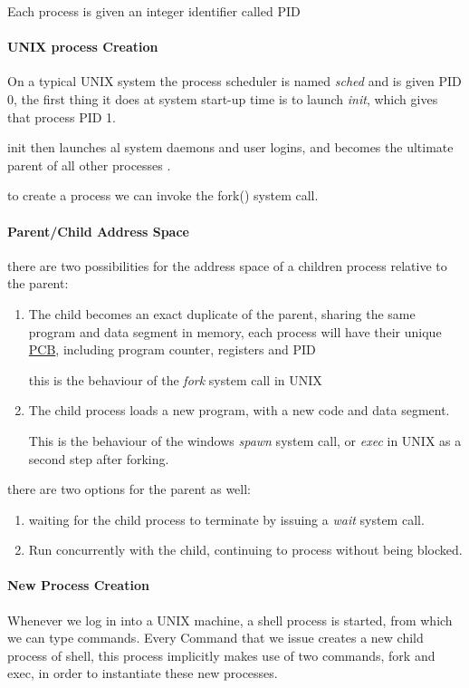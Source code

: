 \documentclass[openright, twoside]{report}
\theoremstyle{definition}
\theoremstyle{example}
\begin{document}
				Each process is given an integer identifier called PID

			\paragraph{UNIX process Creation} On a typical UNIX system the process scheduler is named \emph{sched}
			and is given PID 0, the first thing it does at system start-up time is to launch \emph{init}, which gives that process PID 1.

			init then launches al system daemons and user logins, and becomes the ultimate parent of all other processes .

			to create a process we can invoke the fork() system call. 

			\paragraph{Parent/Child Address Space} there are two possibilities for the address space of a children process relative to 
			the parent:
			\begin{enumerate}
				\item The child becomes an exact duplicate of the parent, sharing the 
				same program and data segment in memory,
				each process will have their unique \hyperref[par:PCB]{PCB}, including 
				program counter, registers and PID 

				this is the behaviour of the \emph{fork} system call in UNIX

				\item The child process loads a new program, with a new code and data segment.

				This is the behaviour of the windows \emph{spawn} system call, or \emph{exec} in UNIX as 
				a second step after forking.

			\end{enumerate}

			there are two options for the parent as well:
			\begin{enumerate}
				\item waiting for the child process to terminate by issuing a \emph{wait} system call. 
				\item Run concurrently with the child, continuing to process without being blocked. 
			\end{enumerate}

			\paragraph{New Process Creation}
			Whenever we log in into a UNIX machine, a shell process is started, from which 
			we can type commands.
			Every Command that we issue creates a new child process of shell, this process 
			implicitly makes use of two commands,
			fork and exec, in order to instantiate these new processes.
\end{document}
